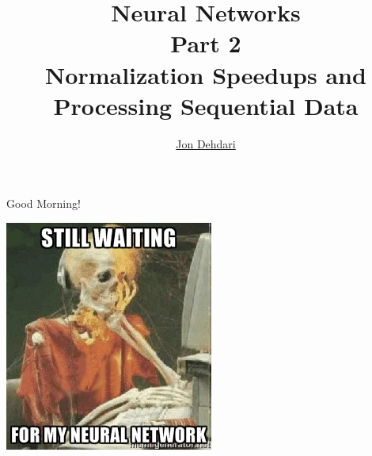\documentclass[xcolor=pdftex,x11names,table,hyperref]{beamer}
\begin{document}
\title{Neural Networks \\[1.5em]
 \small{Part 2} \\[1.0em]
 Normalization Speedups and Processing Sequential Data \\[1.0em]
 }
\author{\href{http://jon.dehdari.org}{Jon Dehdari}}
\frame{\titlepage}

\begin{frame}{Good Morning!}
	\begin{center}
	\includegraphics[height=0.55\textheight]{images/skel_nn.jpg}
	\end{center}
\end{frame}


\end{document}
